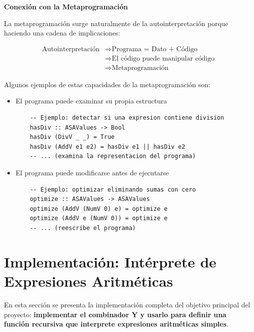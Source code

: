 \documentclass[11pt]{article}
\begin{document}
\textbf{Conexión con la Metaprogramación}

La metaprogramación surge naturalmente de la autointerpretación porque haciendo una cadena de implicaciones:

\begin{align*}
    \text{Autointerpretación} &\Rightarrow \text{Programa = Dato + Código} \\
    &\Rightarrow \text{El código puede manipular código} \\
    &\Rightarrow \text{Metaprogramación}
\end{align*}

Algunos ejemplos de estas capacidades de la metaprogramaci\'on son:
\begin{itemize}
    \item El programa puede examinar su propia estructura
    \begin{lstlisting}
    -- Ejemplo: detectar si una expresion contiene division
    hasDiv :: ASAValues -> Bool
    hasDiv (DivV _ _) = True
    hasDiv (AddV e1 e2) = hasDiv e1 || hasDiv e2
    -- ... (examina la representacion del programa)
    \end{lstlisting}

    \item El programa puede modificarse antes de ejecutarse
    \begin{lstlisting}
    -- Ejemplo: optimizar eliminando sumas con cero
    optimize :: ASAValues -> ASAValues
    optimize (AddV (NumV 0) e) = optimize e
    optimize (AddV e (NumV 0)) = optimize e
    -- ... (reescribe el programa)
    \end{lstlisting}
\end{itemize}
















\section{Implementación: Intérprete de Expresiones Aritméticas}

En esta sección se presenta la implementación completa del objetivo principal del proyecto: \textbf{implementar el combinador Y y usarlo para definir una función recursiva que interprete expresiones aritméticas simples}.
\end{document}
